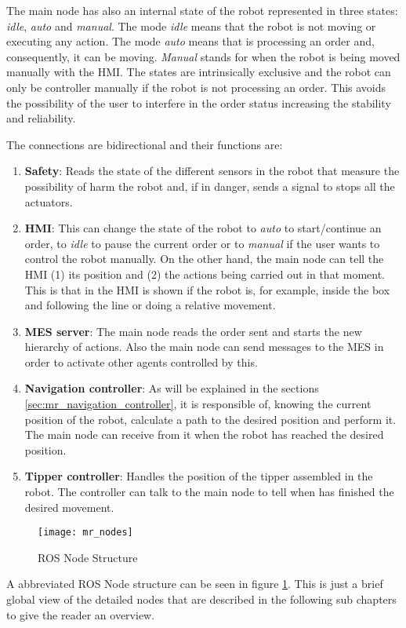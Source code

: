 The main node has also an internal state of the robot represented in three states: \emph{idle}, \emph{auto} and \emph{manual}. 
The mode \emph{idle} means that the robot is not moving or executing any action. 
The mode \emph{auto} means that is processing an order and, consequently, it can be moving. \emph{Manual} stands for when the robot is being moved manually with the HMI. 
The states are intrinsically exclusive and the robot can only be controller manually if the robot is not processing an order.
This avoids the possibility of the user to interfere in the order status increasing the stability and reliability.

The connections are bidirectional and their functions are:
\begin{enumerate}
	\item \textbf{Safety}: Reads the state of the different sensors in the robot that measure the possibility of harm the robot and, if in danger, sends a signal to stops all the actuators.  
	\item \textbf{HMI}: This can change the state of the robot to \emph{auto} to start/continue an order, to \emph{idle} to pause the current order or to \emph{manual} if the user wants to control the robot manually. On the other hand, the main node can tell the HMI (1) its position and (2) the actions being carried out in that moment. This is that in the HMI is shown if the robot is, for example, inside the box and following the line or doing a relative movement.
	\item \textbf{MES server}: The main node reads the order sent and starts the new hierarchy of actions. Also the main node can send messages to the MES in order to activate other agents controlled by this.
	\item \textbf{Navigation controller}: As will be explained in the sections \ref{sec:mr_navigation_controller}, it is responsible of, knowing the current position of the robot, calculate a path to the desired position and perform it. The main node can receive from it when the robot has reached the desired position.
	\item \textbf{Tipper controller}: Handles the position of the tipper assembled in the robot. The controller can talk to the main node to tell when has finished the desired movement.
\end{enumerate}

\begin{figure}[htb]
	\centering
	\texttt{[image: mr\_nodes]}
	\caption{ROS Node Structure}
	\label{fig:mr_ros_nodes}
\end{figure}
A abbreviated ROS Node structure can be seen in figure \ref{fig:mr_ros_nodes}. This is just a brief global view of the detailed nodes that are described in the following sub chapters to give the reader an overview.


